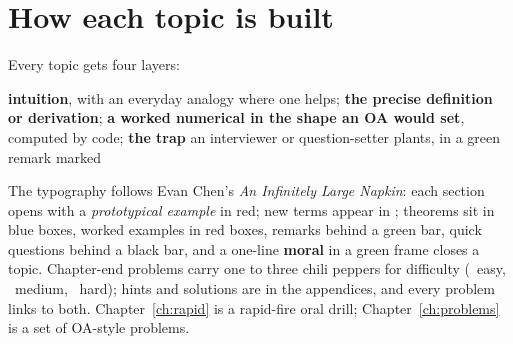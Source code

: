 \section*{How each topic is built}
Every topic gets four layers:
\begin{enumerate}
	\ii \textbf{intuition}, with an everyday analogy where one helps;
	\ii \textbf{the precise definition or derivation};
	\ii \textbf{a worked numerical in the shape an OA would set}, computed by code;
	\ii \textbf{the trap} an interviewer or question-setter plants, in a green remark marked \trap
\end{enumerate}
The typography follows Evan Chen's \emph{An Infinitely Large Napkin}: each section opens with a
\emph{prototypical example} in red; new terms appear in ; theorems sit in blue boxes, worked examples
in red boxes, remarks behind a green bar, quick questions behind a black bar, and a one-line \textbf{moral} in a
green frame closes a topic. Chapter-end problems carry one to three chili peppers for difficulty
(\chili\ easy, \chili\chili\ medium, \chili\chili\chili\ hard); hints and solutions are in the appendices, and every
problem links to both. Chapter~\ref{ch:rapid} is a rapid-fire oral drill; Chapter~\ref{ch:problems} is a set of
OA-style problems.

